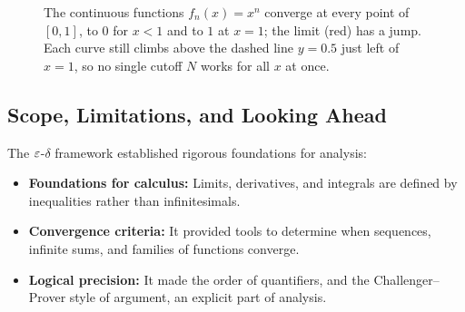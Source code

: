 \begin{figure}[htbp]
\centering
{}
\caption{The continuous functions $f_n(x) = x^n$ converge at every point of $[0, 1]$, to $0$ for $x < 1$ and to $1$ at $x = 1$; the limit (red) has a jump. Each curve still climbs above the dashed line $y = 0.5$ just left of $x = 1$, so no single cutoff $N$ works for all $x$ at once.}\label{20:fig-pointwise-xn}
\end{figure}

\subsection{Scope, Limitations, and Looking Ahead}

The $\varepsilon$-$\delta$ framework established rigorous foundations for analysis:
\begin{itemize}
\item \textbf{Foundations for calculus:} Limits, derivatives, and integrals are defined by inequalities rather than infinitesimals.
\item \textbf{Convergence criteria:} It provided tools to determine when sequences, infinite sums, and families of functions converge.
\item \textbf{Logical precision:} It made the order of quantifiers, and the Challenger--Prover style of argument, an explicit part of analysis.
\end{itemize}

